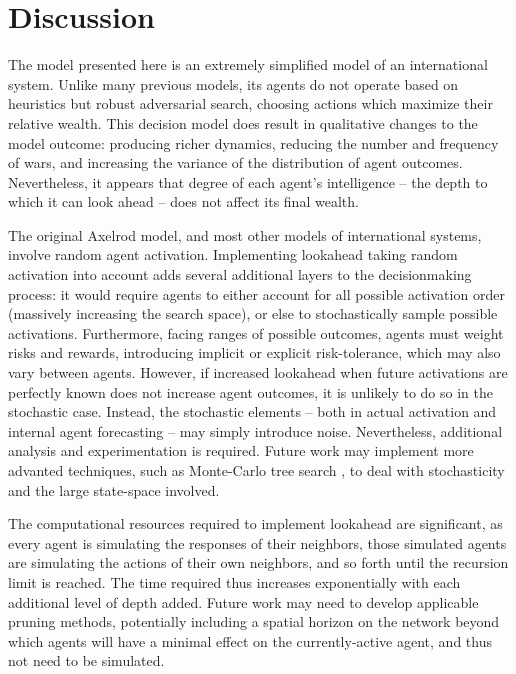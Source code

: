 \documentclass{article}
\begin{document}
\section{Discussion}

The model presented here is an extremely simplified model of an international system. Unlike many previous models, its agents do not operate based on heuristics but robust adversarial search, choosing actions which maximize their relative wealth. This decision model does result in qualitative changes to the model outcome: producing richer dynamics, reducing the number and frequency of wars, and increasing the variance of the distribution of agent outcomes. Nevertheless, it appears that degree of each agent's intelligence -- the depth to which it can look ahead -- does not affect its final wealth. 

The original Axelrod model, and most other models of international systems, involve random agent activation. Implementing lookahead taking random activation into account adds several additional layers to the decisionmaking process: it would require agents to either account for all possible activation order (massively increasing the search space), or else to stochastically sample possible activations. Furthermore, facing ranges of possible outcomes, agents must weight risks and rewards, introducing implicit or explicit risk-tolerance, which may also vary between agents. However, if increased lookahead when future activations are perfectly known does not increase agent outcomes, it is unlikely to do so in the stochastic case. Instead, the stochastic elements -- both in actual activation and internal agent forecasting -- may simply introduce noise. Nevertheless, additional analysis and experimentation is required. Future work may implement more advanted techniques, such as Monte-Carlo tree search \citep{chaslot_2010}, to deal with stochasticity and the large state-space involved.

The computational resources required to implement lookahead are significant, as every agent is simulating the responses of their neighbors, those simulated agents are simulating the actions of their own neighbors, and so forth until the recursion limit is reached. The time required thus increases exponentially with each additional level of depth added. Future work may need to develop applicable pruning methods, potentially including a spatial horizon on the network beyond which agents will have a minimal effect on the currently-active agent, and thus not need to be simulated. 
\end{document}
